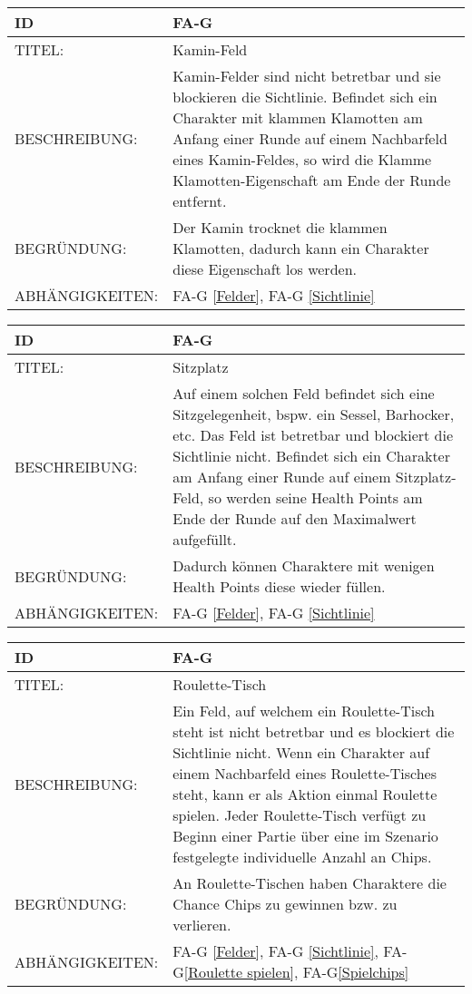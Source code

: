 \begin{tabularx}{16cm}{l|X}
	{table}\label{Kamin-Feld}
	\textbf{ID} & \textbf{FA-G \arabic{table}} \\
	\hline
	TITEL: & Kamin-Feld \\
	\hline
	BESCHREIBUNG: & Kamin-Felder sind nicht betretbar und sie blockieren die Sichtlinie. Befindet sich ein Charakter mit klammen Klamotten am Anfang einer Runde auf einem Nachbarfeld eines Kamin-Feldes, so wird die Klamme Klamotten-Eigenschaft am Ende der Runde entfernt. \\
	\hline
	BEGRÜNDUNG: & Der Kamin trocknet die klammen Klamotten, dadurch kann ein Charakter diese Eigenschaft los werden. \\
	\hline
	ABHÄNGIGKEITEN: & FA-G \ref{Felder}, FA-G \ref{Sichtlinie} \\
\end{tabularx}

\begin{tabularx}{16cm}{l|X}
	{table}\label{Sitzplatz}
	\textbf{ID} & \textbf{FA-G \arabic{table}} \\
	\hline
	TITEL: & Sitzplatz \\
	\hline
	BESCHREIBUNG: & Auf einem solchen Feld befindet sich eine Sitzgelegenheit, bspw. ein Sessel, Barhocker, etc. Das Feld ist betretbar und blockiert die Sichtlinie nicht. Befindet sich ein Charakter am Anfang einer Runde auf einem Sitzplatz-Feld, so werden seine Health Points am Ende der Runde auf den Maximalwert aufgefüllt. \\
	\hline
	BEGRÜNDUNG: & Dadurch können Charaktere mit wenigen Health Points diese wieder füllen. \\
	\hline
	ABHÄNGIGKEITEN: & FA-G \ref{Felder}, FA-G \ref{Sichtlinie} \\
\end{tabularx}


\begin{tabularx}{16cm}{l|X}
	{table}\label{Roulette-Tisch}
	\textbf{ID} & \textbf{FA-G \arabic{table}} \\
	\hline
	TITEL: & Roulette-Tisch \\
	\hline
	BESCHREIBUNG: & Ein Feld, auf welchem ein Roulette-Tisch steht ist nicht betretbar und es blockiert die Sichtlinie nicht. Wenn ein Charakter auf einem Nachbarfeld eines Roulette-Tisches steht, kann er als Aktion einmal Roulette spielen. Jeder Roulette-Tisch verfügt zu Beginn einer Partie über eine im Szenario festgelegte individuelle Anzahl an Chips. \\
	\hline
	BEGRÜNDUNG: & An Roulette-Tischen haben Charaktere die Chance Chips zu gewinnen bzw. zu verlieren. \\
	\hline
	ABHÄNGIGKEITEN: & FA-G \ref{Felder}, FA-G \ref{Sichtlinie}, FA-G\ref{Roulette spielen}, FA-G\ref{Spielchips} \\
\end{tabularx}

